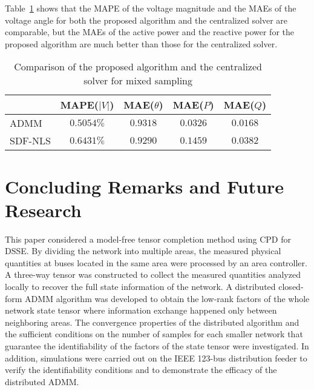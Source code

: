 \documentclass[journal]{IEEEtran}
\newcounter{propose}
\newcounter{thm}
\begin{document}
Table~\ref{tab:comparisonofadmmsdfmixed} shows that the MAPE of the voltage magnitude and the MAEs of the voltage angle  for both the proposed algorithm and the centralized solver are comparable, but the MAEs of the active power and the reactive power for the proposed algorithm are much better than those for the centralized solver. 
\begin{table}
	\renewcommand{\arraystretch}{1}
	\caption{Comparison of the proposed algorithm and the centralized solver for mixed sampling }\vspace{-10pt}
\label{tab:comparisonofadmmsdfmixed}
	\begin{center}
		\begin{tabular}{l c c c c } 
			\toprule
	            & MAPE($|V|$)  & MAE($\theta$) & MAE($P$) & MAE($Q$) \\
			\midrule
			ADMM &  $0.5054\%$ & $0.9318$ & $0.0326$ & $ 0.0168$ \\
		SDF-NLS & $0.6431\%$ & $0.9290 $ & $0.1459$ & $0.0382$\\
		\bottomrule
		\end{tabular}\vspace{-15pt}
	\end{center}
\end{table}

\section{Concluding Remarks and Future Research}
\label{sec:conclusion}
This paper considered a  model-free tensor completion method using CPD for DSSE. By dividing the network into multiple areas, the measured physical quantities at buses located in the same area were processed by an area controller. A three-way tensor was constructed to collect the measured quantities analyzed locally to recover the full state information of the network. A distributed closed-form ADMM algorithm was developed to obtain the low-rank factors of the whole network state tensor where information exchange happened only between neighboring areas.  The convergence properties of
the distributed algorithm and the sufficient conditions on the number of samples for each smaller network that guarantee the identifiability of the factors of the state tensor were investigated.
In  addition,  simulations  were  carried out 
on the  IEEE 123-bus  distribution  feeder to  verify the identifiability conditions and to demonstrate the efficacy of the distributed ADMM.   

\end{document}
